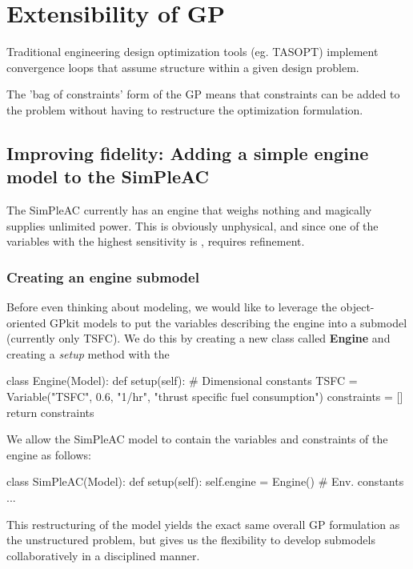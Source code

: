 \chapter{Extensibility of GP}

Traditional engineering design optimization tools (eg. TASOPT) implement convergence loops that assume structure within a given design problem. 

The 'bag of constraints' form of the GP means that constraints can be added to the problem without 
having to restructure the optimization formulation. 

\section{Improving fidelity: Adding a simple engine model to the SimPleAC}
\label{s:engine}

The SimPleAC currently has an engine that weighs nothing and magically supplies
unlimited power. This is obviously unphysical, and since one of the variables
with the highest sensitivity is \TSFC, requires refinement.

\subsection{Creating an engine submodel}

Before even thinking about modeling, we would like to leverage the object-oriented 
GPkit models to put the variables describing the engine into a submodel (currently only 
TSFC). We do this by creating a new class called \textbf{Engine} and creating a \textit{setup}
method with the 

\begin{python}
class Engine(Model):
    def setup(self):
        # Dimensional constants
        TSFC      = Variable("TSFC", 0.6, "1/hr", "thrust specific fuel consumption")
        constraints = []
        return constraints    
\end{python}

We allow the SimPleAC model to contain the variables and constraints of the engine
as follows:

\begin{python}
class SimPleAC(Model):
    def setup(self):
        self.engine = Engine()
        # Env. constants
        ...
\end{python}

This restructuring of the model yields the exact same overall GP formulation 
as the unstructured problem, but gives us the flexibility to develop submodels
collaboratively in a disciplined manner.  


